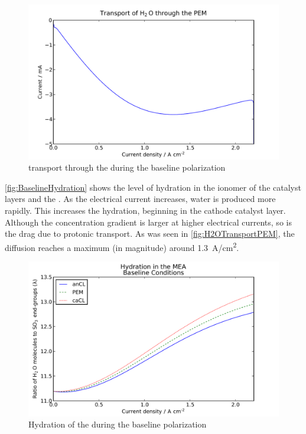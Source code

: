 \begin{figure}[htbp]
  \includegraphics[width=\linewidth]{Results/Cell/Model/1/H2OTransportPEM}%
  \caption[ transport through the membrane during the baseline polarization]{ transport through the  during the baseline polarization}%
  \label{fig:H2OTransportPEM}
\end{figure}

\autoref{fig:BaselineHydration} shows the level of hydration in the ionomer of the catalyst layers and the .  As the electrical current increases, water is produced more rapidly.  This increases the hydration, beginning in the cathode catalyst layer.  Although the concentration gradient is larger at higher electrical currents, so is the drag due to protonic transport.  As was seen in \autoref{fig:H2OTransportPEM}, the diffusion reaches a maximum (in magnitude) around \SI{1.3}{A/cm^2}.

\begin{figure}[htbp]
  \includegraphics[width=\linewidth]{Results/Cell/Model/1/Hydration}%
  \caption[Hydration during the baseline polarization test]{Hydration of the  during the baseline polarization}%
  \label{fig:BaselineHydration}
\end{figure}

